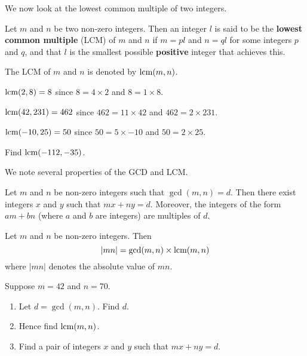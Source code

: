We now look at the lowest common multiple of two integers.
\begin{definition}
    Let $m$ and $n$ be two non-zero integers. Then an integer $l$ is said to be the \textbf{lowest common multiple} (LCM) of $m$ and $n$ if $m = pl$ and $n = ql$ for some integers $p$ and $q$, and that $l$ is the smallest possible \textbf{positive} integer that achieves this.
\end{definition}
The LCM of $m$ and $n$ is denoted by $\mathrm{lcm}(m,n)$.

\begin{example}
    $\mathrm{lcm}(2, 8) = 8$ since $8 = 4 \times 2$ and $8 = 1 \times 8$.
\end{example}
\begin{example}
    $\mathrm{lcm}(42, 231) = 462$ since $462 = 11 \times 42$ and $462 = 2 \times 231$.
\end{example}
\begin{example}
    $\mathrm{lcm}(-10, 25) = 50$ since $50 = 5 \times -10$ and $50 = 2 \times 25$.
\end{example}
\begin{exercise}
    Find $\mathrm{lcm}(-112, -35)$.
\end{exercise}

We note several properties of the GCD and LCM.
\begin{lemma}[B\'{e}zout]\label{lemma-bezout}
    Let $m$ and $n$ be non-zero integers such that $\gcd(m, n) = d$. Then there exist integers $x$ and $y$ such that $mx + ny = d$. Moreover, the integers of the form $am + bn$ (where $a$ and $b$ are integers) are multiples of $d$.
\end{lemma}
\begin{proposition}\label{prop-product-of-gcd-and-lcm}
    Let $m$ and $n$ be non-zero integers. Then
    \[
        |mn| = \gcd(m,n) \times \mathrm{lcm}(m,n)    
    \]
    where $|mn|$ denotes the absolute value of $mn$.
\end{proposition}

\begin{exercise}
    Suppose $m = 42$ and $n = 70$.
    \begin{enumerate}[label=(\roman*)]
        \item Let $d = \gcd(m,n)$. Find $d$.
        \item Hence find $\mathrm{lcm}(m,n)$.
        \item Find a pair of integers $x$ and $y$ such that $mx + ny = d$.
    \end{enumerate}
\end{exercise}

